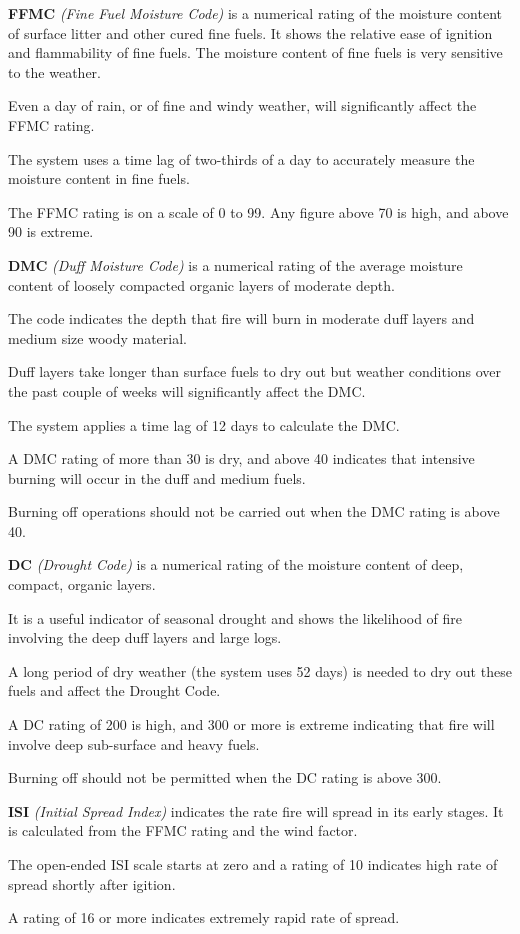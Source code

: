 {\bfseries F\-F\-M\-C} {\itshape (Fine Fuel Moisture Code)} is a numerical rating of the moisture content of surface litter and other cured fine fuels. It shows the relative ease of ignition and flammability of fine fuels. The moisture content of fine fuels is very sensitive to the weather.\par
 Even a day of rain, or of fine and windy weather, will significantly affect the F\-F\-M\-C rating.\par
 The system uses a time lag of two-\/thirds of a day to accurately measure the moisture content in fine fuels.\par
 The F\-F\-M\-C rating is on a scale of 0 to 99. Any figure above 70 is high, and above 90 is extreme. 

{\bfseries D\-M\-C} {\itshape (Duff Moisture Code)} is a numerical rating of the average moisture content of loosely compacted organic layers of moderate depth.\par
 The code indicates the depth that fire will burn in moderate duff layers and medium size woody material.\par
 Duff layers take longer than surface fuels to dry out but weather conditions over the past couple of weeks will significantly affect the D\-M\-C.\par
 The system applies a time lag of 12 days to calculate the D\-M\-C.\par
 A D\-M\-C rating of more than 30 is dry, and above 40 indicates that intensive burning will occur in the duff and medium fuels.\par
 Burning off operations should not be carried out when the D\-M\-C rating is above 40. 

{\bfseries D\-C} {\itshape (Drought Code)} is a numerical rating of the moisture content of deep, compact, organic layers.\par
 It is a useful indicator of seasonal drought and shows the likelihood of fire involving the deep duff layers and large logs.\par
 A long period of dry weather (the system uses 52 days) is needed to dry out these fuels and affect the Drought Code.\par
 A D\-C rating of 200 is high, and 300 or more is extreme indicating that fire will involve deep sub-\/surface and heavy fuels.\par
 Burning off should not be permitted when the D\-C rating is above 300. 

{\bfseries I\-S\-I} {\itshape (Initial Spread Index)} indicates the rate fire will spread in its early stages. It is calculated from the F\-F\-M\-C rating and the wind factor.\par
 The open-\/ended I\-S\-I scale starts at zero and a rating of 10 indicates high rate of spread shortly after igition.\par
 A rating of 16 or more indicates extremely rapid rate of spread. 

